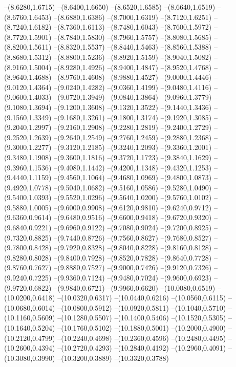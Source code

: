 {\begin{scope}
--(8.6280,1.6715)
--(8.6400,1.6650)
--(8.6520,1.6585)
--(8.6640,1.6519)
--(8.6760,1.6453)
--(8.6880,1.6386)
--(8.7000,1.6319)
--(8.7120,1.6251)
--(8.7240,1.6182)
--(8.7360,1.6113)
--(8.7480,1.6043)
--(8.7600,1.5972)
--(8.7720,1.5901)
--(8.7840,1.5830)
--(8.7960,1.5757)
--(8.8080,1.5685)
--(8.8200,1.5611)
--(8.8320,1.5537)
--(8.8440,1.5463)
--(8.8560,1.5388)
--(8.8680,1.5312)
--(8.8800,1.5236)
--(8.8920,1.5159)
--(8.9040,1.5082)
--(8.9160,1.5004)
--(8.9280,1.4926)
--(8.9400,1.4847)
--(8.9520,1.4768)
--(8.9640,1.4688)
--(8.9760,1.4608)
--(8.9880,1.4527)
--(9.0000,1.4446)
--(9.0120,1.4364)
--(9.0240,1.4282)
--(9.0360,1.4199)
--(9.0480,1.4116)
--(9.0600,1.4033)
--(9.0720,1.3949)
--(9.0840,1.3864)
--(9.0960,1.3779)
--(9.1080,1.3694)
--(9.1200,1.3608)
--(9.1320,1.3522)
--(9.1440,1.3436)
--(9.1560,1.3349)
--(9.1680,1.3261)
--(9.1800,1.3174)
--(9.1920,1.3085)
--(9.2040,1.2997)
--(9.2160,1.2908)
--(9.2280,1.2819)
--(9.2400,1.2729)
--(9.2520,1.2639)
--(9.2640,1.2549)
--(9.2760,1.2459)
--(9.2880,1.2368)
--(9.3000,1.2277)
--(9.3120,1.2185)
--(9.3240,1.2093)
--(9.3360,1.2001)
--(9.3480,1.1908)
--(9.3600,1.1816)
--(9.3720,1.1723)
--(9.3840,1.1629)
--(9.3960,1.1536)
--(9.4080,1.1442)
--(9.4200,1.1348)
--(9.4320,1.1253)
--(9.4440,1.1159)
--(9.4560,1.1064)
--(9.4680,1.0969)
--(9.4800,1.0873)
--(9.4920,1.0778)
--(9.5040,1.0682)
--(9.5160,1.0586)
--(9.5280,1.0490)
--(9.5400,1.0393)
--(9.5520,1.0296)
--(9.5640,1.0200)
--(9.5760,1.0102)
--(9.5880,1.0005)
--(9.6000,0.9908)
--(9.6120,0.9810)
--(9.6240,0.9712)
--(9.6360,0.9614)
--(9.6480,0.9516)
--(9.6600,0.9418)
--(9.6720,0.9320)
--(9.6840,0.9221)
--(9.6960,0.9122)
--(9.7080,0.9024)
--(9.7200,0.8925)
--(9.7320,0.8825)
--(9.7440,0.8726)
--(9.7560,0.8627)
--(9.7680,0.8527)
--(9.7800,0.8428)
--(9.7920,0.8328)
--(9.8040,0.8228)
--(9.8160,0.8128)
--(9.8280,0.8028)
--(9.8400,0.7928)
--(9.8520,0.7828)
--(9.8640,0.7728)
--(9.8760,0.7627)
--(9.8880,0.7527)
--(9.9000,0.7426)
--(9.9120,0.7326)
--(9.9240,0.7225)
--(9.9360,0.7124)
--(9.9480,0.7024)
--(9.9600,0.6923)
--(9.9720,0.6822)
--(9.9840,0.6721)
--(9.9960,0.6620)
--(10.0080,0.6519)
--(10.0200,0.6418)
--(10.0320,0.6317)
--(10.0440,0.6216)
--(10.0560,0.6115)
--(10.0680,0.6014)
--(10.0800,0.5912)
--(10.0920,0.5811)
--(10.1040,0.5710)
--(10.1160,0.5609)
--(10.1280,0.5507)
--(10.1400,0.5406)
--(10.1520,0.5305)
--(10.1640,0.5204)
--(10.1760,0.5102)
--(10.1880,0.5001)
--(10.2000,0.4900)
--(10.2120,0.4799)
--(10.2240,0.4698)
--(10.2360,0.4596)
--(10.2480,0.4495)
--(10.2600,0.4394)
--(10.2720,0.4293)
--(10.2840,0.4192)
--(10.2960,0.4091)
--(10.3080,0.3990)
--(10.3200,0.3889)
--(10.3320,0.3788)

\end{scope}}
